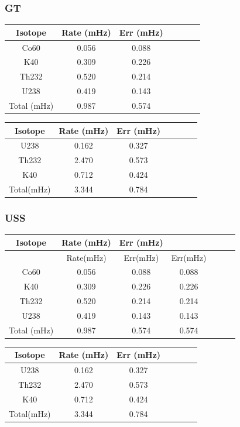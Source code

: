 \documentclass[review,number,sort&compress]{elsarticle}
\begin{document}
\subsubsection{GT}


\begin{tabular*}{150mm}{@{\extracolsep{\fill}}ccccccc}
	\toprule  %
	Isotope	& Rate (mHz)&	Err (mHz)\\
	\midrule  %
	Co60	& 	0.056&	0.088	\\ 
	K40	& 	0.309&	0.226	\\
	Th232&	0.520&	0.214	\\
	U238 &    0.419&	0.143	\\
	Total (mHz)&	0.987&	0.574	\\
	\bottomrule  %
\end{tabular*}

\begin{tabular*}{150mm}{@{\extracolsep{\fill}}ccccccc}
	\toprule  %
	Isotope	&	Rate (mHz)&	Err (mHz)\\
	\midrule  %
	U238	&	0.162	  &      0.327\\ 
	Th232	&	2.470	  &      0.573\\
	K40	&	0.712	  &      0.424\\
	Total(mHz)&	3.344	  &      0.784\\
	\bottomrule  %
\end{tabular*}

\subsubsection{USS}
\begin{tabular*}{150mm}{@{\extracolsep{\fill}}ccccccc}
	Isotope	& Rate (mHz)&	Err (mHz)\\
	\toprule  %
			&   Rate(mHz)&	Err(mHz)&Err(mHz)\\
	\midrule  %
	Co60		& 	0.056&	0.088	&0.088	\\ 
	K40		& 	0.309&	0.226	&0.226	\\
	Th232		&	0.520&	0.214	&0.214	\\
	U238 		&    	0.419&	0.143	&0.143	\\
	Total (mHz)	&	0.987&	0.574	&0.574	\\
	\bottomrule  %
\end{tabular*}

\begin{tabular*}{150mm}{@{\extracolsep{\fill}}ccccccc}
	\toprule  %
	Isotope	&	Rate (mHz)&	Err (mHz)\\
	\midrule  %
	U238	&	0.162	  &      0.327\\ 
	Th232	&	2.470	  &      0.573\\
	K40	&	0.712	  &      0.424\\
	Total(mHz)&	3.344	  &      0.784\\
	\bottomrule  %
\end{tabular*}
\end{document}
